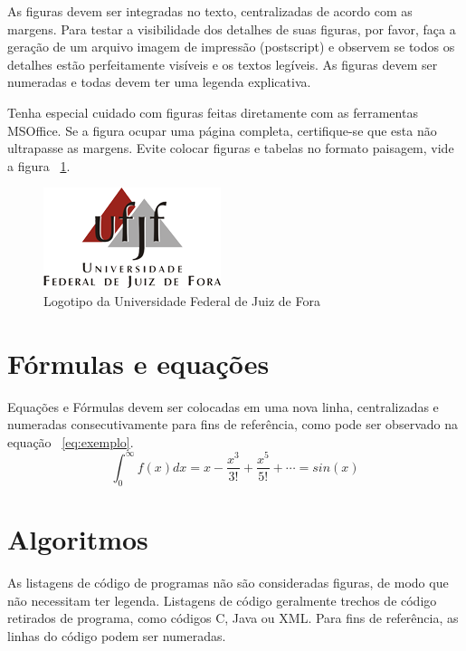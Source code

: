 \documentclass[a4paper,12pt]{monografia}
\theoremstyle{plain}
\theoremstyle{definition}
\theoremstyle{remark}
\begin{document}
As figuras devem ser integradas no texto, centralizadas de acordo com as margens. Para testar a visibilidade dos detalhes de suas figuras, por favor, fa\c{c}a a gera\c{c}\~ao de um arquivo imagem de impress\~ao (postscript) e observem se todos os detalhes est\~ao perfeitamente vis\'iveis e os textos leg\'iveis.  As figuras devem ser numeradas e todas devem ter uma legenda explicativa. 

Tenha especial cuidado com figuras feitas diretamente com as ferramentas MSOffice. Se a figura ocupar uma p\'agina completa, certifique-se que esta n\~ao ultrapasse as margens. Evite colocar figuras e tabelas no formato paisagem, vide a figura ~\ref{fig:logoufjf}.

\begin{figure}[ht]
 \begin{center}
   \includegraphics{./figs/logoInstituicao.png} %
  \caption{Logotipo da Universidade Federal de Juiz de Fora}
  \label{fig:logoufjf}
 \end{center}
\end{figure}

\section{F\'ormulas e equa\c{c}\~oes}
Equa\c{c}\~oes e F\'ormulas devem ser colocadas em uma nova linha, centralizadas e numeradas consecutivamente para fins de refer\^encia, como pode ser observado na equa\c{c}\~ao ~\ref{eq:exemplo}.
\begin{equation}
\int_{0}^{\infty}f(x)dx = x - \frac{x^3}{3!} + \frac{x^5}{5!} + \cdots = sin(x)
\label{eq:exemplo}
\end{equation}

\section{Algoritmos} 
As listagens de c\'odigo de programas n\~ao s\~ao consideradas figuras, de modo que n\~ao necessitam ter legenda. Listagens de c\'odigo geralmente trechos de c\'odigo retirados de programa, como c\'odigos C, Java ou XML. Para fins de refer\^encia, as linhas do c\'odigo podem ser numeradas.
\end{document}
